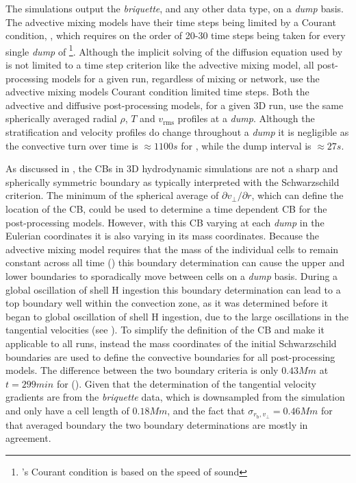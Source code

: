 \documentclass[fleqn,usenatbib]{mnras}
\newcommand{\ppmstar}{\code{PPMstar}}
\begin{document}
The \ppmstar{} simulations output the \textit{briquette}, and any other data
type, on a \textit{dump} basis. The advective mixing models have their time
steps being limited by a Courant condition, , which requires on the
order of 20-30 time steps being taken for every single \textit{dump} of
\footnote{\ppmstar{}'s Courant condition is based on the speed of
sound}. Although the implicit solving of the diffusion equation used by \mppnp{}
is not limited to a time step criterion like the advective mixing model, all
post-processing models for a given run, regardless of mixing or network, use the
advective mixing models Courant condition limited time steps. Both the
advective and diffusive post-processing models, for a given 3D
\ppmstar{} run, use the same spherically averaged radial $\rho$, $T$ and $v_{\mathrm{rms}}$
profiles at a \textit{dump}. Although the stratification and velocity profiles do change
throughout a \textit{dump} it is negligible as the convective turn over time is
$\approx \unit{1100}{s}$ for , while the dump interval is $\approx
\unit{27}{s}$.

As discussed in , the CBs in 3D hydrodynamic simulations are
not a sharp and spherically symmetric boundary as typically interpreted with the
Schwarzschild criterion. The minimum of the spherical average of $\partial
v_{\perp} / \partial r$, which can define the location of the CB, could be used
to determine a time dependent CB for the post-processing models. However, with
this CB varying at each \textit{dump} in the Eulerian coordinates it is also
varying in its mass coordinates. Because the advective mixing model requires
that the mass of the individual cells to remain constant across all time
() this boundary determination can cause the upper and
lower boundaries to sporadically move between cells on a \textit{dump} basis.
During a global oscillation of shell H ingestion this boundary determination can lead to a top boundary well within
the convection zone, as it was determined before it began to global oscillation of shell H ingestion, due to the
large oscillations in the tangential velocities (see ). To
simplify the definition of the CB and make it applicable to all runs, instead
the mass coordinates of the initial Schwarzschild boundaries are used to define
the convective boundaries for all post-processing models. The difference between
the two boundary criteria is only $\unit{0.43}{Mm}$ at $t = \unit{299}{min}$ for
 (). Given that the determination of the tangential
velocity gradients are from the \textit{briquette} data, which is downsampled
from the \ppmstar{} simulation and only have a cell length of $\unit{0.18}{Mm}$,
and the fact that $\sigma_{r_{\mathrm{b}}, v_{\perp}} = \unit{0.46}{Mm}$ for
that averaged boundary the two boundary determinations are mostly in agreement.
\end{document}
